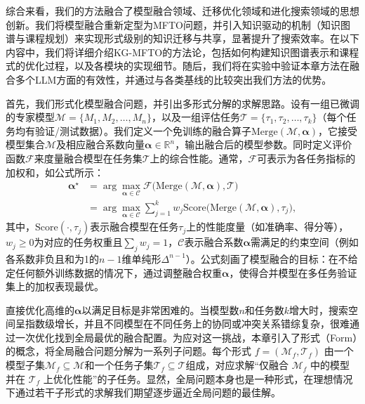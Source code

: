 \documentclass[../main.tex]{subfiles}
\begin{document}
综合来看，我们的方法融合了模型融合领域、迁移优化领域和进化搜索领域的思想创新。我们将模型融合重新定型为MFTO问题，并引入知识驱动的机制（知识图谱与课程规划）来实现形式级别的知识迁移与共享，显著提升了搜索效率。在以下内容中，我们将详细介绍KG-MFTO的方法论，包括如何构建知识图谱表示和课程式的优化过程，以及各模块的实现细节。随后，我们将在实验中验证本章方法在融合多个LLM方面的有效性，并通过与各类基线的比较突出我们方法的优势。


首先，我们形式化模型融合问题，并引出多形式分解的求解思路。设有一组已微调的专家模型$\mathcal{M}=\{M_{1}, M_{2}, \ldots, M_{n}\}$，以及一组评估任务$\mathcal{T}=\{\tau_{1}, \tau_{2}, \ldots, \tau_{k}\}$（每个任务均有验证/测试数据）。我们定义一个免训练的融合算子$\mathrm{Merge}(\mathcal{M}, \boldsymbol{\alpha})$，它接受模型集合$\mathcal{M}$及相应融合系数向量$\boldsymbol{\alpha}\in \mathbb{R}^n$，输出融合后的模型参数。同时定义评价函数$\mathcal{F}$来度量融合模型在任务集$\mathcal{T}$上的综合性能。通常，$\mathcal{F}$可表示为各任务指标的加权和，如公式所示：
\begin{equation}
	\begin{aligned}
		\boldsymbol{\alpha}^{\star} & = \arg\max_{\boldsymbol{\alpha}\in\mathcal{C}} \mathcal{F}\Big(\mathrm{Merge}(\mathcal{M},\boldsymbol{\alpha}), \mathcal{T}\Big)                 \\
		{}                          & = \arg\max_{\boldsymbol{\alpha}\in\mathcal{C}} \sum_{j=1}^{k} w_j \text{Score}\Big(\mathrm{Merge}(\mathcal{M},\boldsymbol{\alpha}), \tau_j\Big),
	\end{aligned}
\end{equation}
其中，$\text{Score}(\cdot,\tau_j)$表示融合模型在任务$\tau_j$上的性能度量（如准确率、得分等），$w_j \ge 0$为对应的任务权重且$\sum_{j}w_j=1$，$\mathcal{C}$表示融合系数$\boldsymbol{\alpha}$需满足的约束空间（例如各系数非负且和为1的$n-1$维单纯形$\Delta^{n-1}$）。公式刻画了模型融合的目标：在不给定任何额外训练数据的情况下，通过调整融合权重$\boldsymbol{\alpha}$，使得合并模型在多任务验证集上的加权表现最优。

直接优化高维的$\boldsymbol{\alpha}$以满足目标是非常困难的。当模型数$n$和任务数$k$增大时，搜索空间呈指数级增长，并且不同模型在不同任务上的协同或冲突关系错综复杂，很难通过一次优化找到全局最优的融合配置。为应对这一挑战，本章引入了形式（Form）的概念，将全局融合问题分解为一系列子问题。每个形式 $f=(\mathcal{M}_f,\mathcal{T}_f)$ 由一个模型子集$\mathcal{M}_f \subseteq \mathcal{M}$和一个任务子集$\mathcal{T}_f \subseteq \mathcal{T}$组成，对应求解“仅融合 $\mathcal{M}_f$ 中的模型并在 $\mathcal{T}_f$ 上优化性能”的子任务。显然，全局问题本身也是一种形式，在理想情况下通过若干子形式的求解我们期望逐步逼近全局问题的最佳解。
\end{document}
